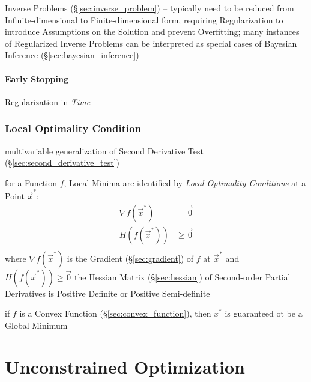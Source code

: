 \fist Inverse Problems (\S\ref{sec:inverse_problem}) -- typically need to be
reduced from Infinite-dimensional to Finite-dimensional form, requiring
Regularization to introduce Assumptions on the Solution and prevent Overfitting;
many instances of Regularized Inverse Problems can be interpreted as special
cases of Bayesian Inference (\S\ref{sec:bayesian_inference})



\paragraph{Early Stopping}\label{sec:early_stopping}\hfill

Regularization in \emph{Time}



\subsubsection{Local Optimality Condition}\label{sec:local_optimality}


\fist multivariable generalization of Second Derivative Test
(\S\ref{sec:second_derivative_test})

for a Function $f$, Local Minima are identified by \emph{Local Optimality
  Conditions} at a Point $\vec{x}^*$:
\begin{align*}
  \nabla f(\vec{x}^*) & =    \vec{0} \\
  H(f(\vec{x}^*))     & \geq \vec{0} \\
\end{align*}
where $\nabla f(\vec{x}^*)$ is the Gradient (\S\ref{sec:gradient}) of $f$ at
$\vec{x}^*$ and $H(f(\vec{x}^*)) \geq \vec{0}$ the Hessian Matrix
(\S\ref{sec:hessian}) of Second-order Partial Derivatives is Positive
Definite or Positive Semi-definite

if $f$ is a Convex Function (\S\ref{sec:convex_function}), then $x^*$ is
guaranteed ot be a Global Minimum



\section{Unconstrained Optimization}\label{sec:unconstrained_optimization}

